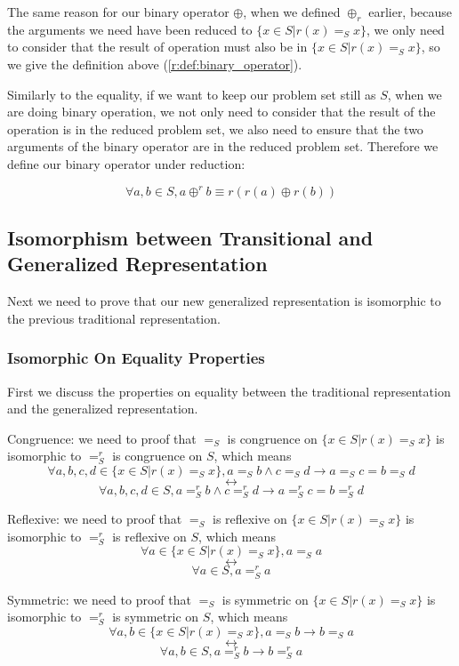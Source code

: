 \documentclass[a4paper,12pt,twoside,openright]{report}
\newcommand{\e}[2]{
\begin{equation}
  \label{#1} 
  #2
\end{equation}
}
\begin{document}
The same reason for our binary operator $\oplus$, when we defined $\oplus_r$ earlier, because the arguments we need have been reduced to $\{x \in S | r(x) =_S x \}$, we only need to consider that the result of operation must also be in $\{x \in S | r(x) =_S x\}$, so we give the definition above (\ref{r:def:binary_operator}).

Similarly to the equality, if we want to keep our problem set still as $S$, when we are doing binary operation, we not only need to consider that the result of the operation is in the reduced problem set, we also need to ensure that the two arguments of the binary operator are in the reduced problem set. Therefore we define our binary operator under reduction:
\e{gr:def:binary_operator}{\forall a,b \in S, a \oplus^r b \equiv r(r(a) \oplus r(b))}

\subsection{Isomorphism between Transitional and Generalized Representation}
Next we need to prove that our new generalized representation is isomorphic to the previous traditional representation.

\subsubsection{Isomorphic On Equality Properties}
First we discuss the properties on equality between the traditional representation and the generalized representation.

Congruence: we need to proof that $=_S$ is congruence on $\{x \in S | r(x) =_S x\}$ is isomorphic to $=^r_S$ is congruence on $S$, which means 
\[\forall a,b,c,d \in \{x \in S | r(x) =_S x \}, a =_S b \wedge c =_S d \rightarrow a =_S c = b =_S d \]
\[\longleftrightarrow \]
\[\forall a,b,c,d \in S, a =^r_S b \wedge c =^r_S d \rightarrow a =^r_S c = b =^r_S d
\]

Reflexive: we need to proof that $=_S$ is reflexive on $\{x \in S | r(x) =_S x \}$ is isomorphic to $=^r_S$ is reflexive on $S$, which means 
\[\forall a \in \{x \in S | r(x) =_S x \}, a =_S a \]
\[\longleftrightarrow \]
\[\forall a \in S, a =^r_S a
\]

Symmetric: we need to proof that $=_S$ is symmetric on $\{x \in S | r(x) =_S x\}$ is isomorphic to $=^r_S$ is symmetric on $S$, which means 
\[\forall a,b \in \{x \in S | r(x) =_S x \}, a =_S b \rightarrow b =_S a \]
\[\longleftrightarrow \]
\[\forall a,b \in S, a =^r_S b \rightarrow b =^r_S a
\]
\end{document}
